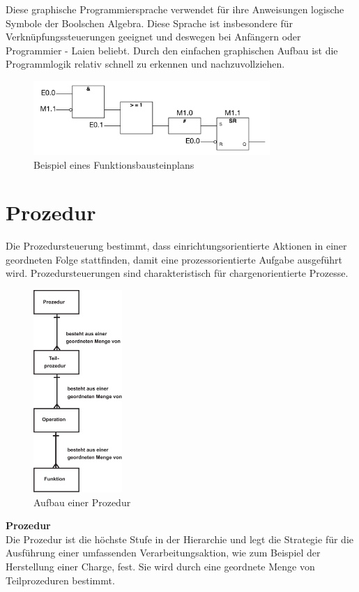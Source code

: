 	Diese graphische Programmiersprache verwendet für ihre Anweisungen logische Symbole der Boolschen Algebra. Diese Sprache ist insbesondere für Verknüpfungssteuerungen geeignet und deswegen bei Anfängern oder Programmier - Laien beliebt. Durch den einfachen graphischen Aufbau ist die Programmlogik relativ schnell zu erkennen und nachzuvollziehen.

	\begin{figure}[h!]
  		\centering
    	\includegraphics[width=0.8\textwidth]{graphics/stateoftheart/funktionsbausteinplan_Selfmade.png}
  		\caption{Beispiel eines Funktionsbausteinplans \cite{funktionsbausteinplan}}
	\end{figure}
\newpage
\section{Prozedur}
Die Prozedursteuerung bestimmt, dass einrichtungsorientierte Aktionen in einer geordneten Folge stattfinden, damit eine prozessorientierte Aufgabe ausgeführt wird. Prozedursteuerungen sind charakteristisch für chargenorientierte Prozesse.\\

\begin{figure}[h!]
		\centering
		\includegraphics[width=0.3\textwidth]{graphics/stateoftheart/prozedursteuerung.png}
		\caption{Aufbau einer Prozedur \cite{en61512}}
\end{figure}
\newpage
\textbf{Prozedur}\\
Die Prozedur ist die höchste Stufe in der Hierarchie und legt die Strategie für die Ausführung einer umfassenden Verarbeitungsaktion, wie zum Beispiel der Herstellung einer Charge, fest. Sie wird durch eine geordnete Menge von Teilprozeduren bestimmt.\\

